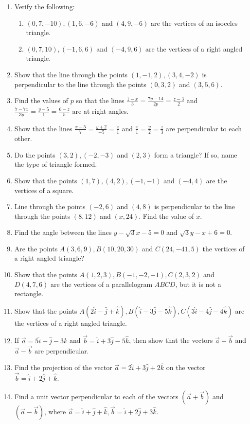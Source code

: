 \begin{enumerate}[label=\thesubsection.\arabic*, ref=\thesubsection.\theenumi]
\item Verify the following:
\begin{enumerate}
\item $(0, 7, -10),  (1, 6, -6)$ and $(4, 9, -6)$ are the vertices of an isoceles triangle.
\item $(0, 7, 10),  (-1, 6, 6)$ and $(-4, 9, 6)$ are the vertices of a right angled triangle.
\end{enumerate}
\item  Show that the line through the points $(1, -1, 2), (3, 4, -2 )$ is perpendicular to the line through the points $(0, 3, 2)$ and $(3, 5, 6)$.
\item Find the values of $p$ so that the lines $ \frac{1-x}{3}=\frac{7y-14}{2p}=\frac{z-3}{2}$ and $ \frac{7-7x}{3p}=\frac{y-5}{1}=\frac{6-z}{5}$ are at right angles.
\item Show that the lines $ \frac{x-5}{7}=\frac{y+2}{-5}=\frac{z}{1}$ and $ \frac{x}{1}=\frac{y}{2}=\frac{z}{3}$ are perpendicular to each other.
\item Do the points $(3,2), (-2,-3)$ and $(2,3)$ form a triangle? If so, name the type of triangle formed.
\item Show that the points $(1,7),(4,2),(-1,-1)$ and $(-4,4)$ are the vertices of a square.
\item Line through the points $(-2,6)$ and $(4,8)$ is perpendicular to the line through the points $(8,12)$ and $(x,24)$. Find the value of $x$.
\item Find the angle between the lines $y-\sqrt 3x-5=0$ and $\sqrt 3y-x+6=0$.
\item Are the points $A(3,6,9), B(10,20,30)$ and $C(24,-41,5)$ the vertices of a right angled triangle?
\item Show that the points $A(1,2,3), B(-1,-2,-1), C(2,3,2)$ and $D(4,7,6)$ are the vertices of a parallelogram $ABCD$, but it is not a rectangle.
\item Show that the points $A(2\hat{i} -\hat{j} +\hat{k}), B(\hat{i} -3\hat{j}-5\hat{k}),C(3\hat{i} -4\hat{j} -4\hat{k})$ are the vertices of a right angled triangle.
\item If $\overrightarrow{a} = 5\hat{i} -\hat{j} -3{k}$ and $\overrightarrow{b} = \hat{i} +3\hat{j} -5\hat{k}$, then show that the vectors $\overrightarrow{a}+\overrightarrow{b}$ and $\overrightarrow{a}-\overrightarrow{b}$ are perpendicular.
\item Find the projection of the vector $\overrightarrow{a} = 2\hat{i} +3\hat{j} +2\hat{k}$ on the vector $\overrightarrow{b} = \hat{i} +2\hat{j} +\hat{k}$.
\item Find a unit vector perpendicular to each of the vectors $(\overrightarrow{a} +\overrightarrow{b})$ and $(\overrightarrow{a} -\overrightarrow{b})$, where $\overrightarrow{a}=\hat{i} +\hat{j} +\hat{k}, \overrightarrow{b} = \hat{i} +2\hat{j} +3\hat{k}$.
\end{enumerate}
